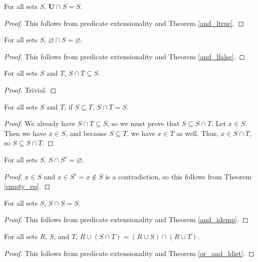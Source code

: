\documentclass[../math.tex]{subfiles}
\begin{document}
\begin{theorem} \label{inter_lid}
    For all sets $S$, $\bm U \cap S = S$.
\end{theorem}
\begin{proof}
    This follows from predicate extensionality and Theorem \ref{and_ltrue}.
\end{proof}

\begin{theorem} \label{inter_lanni}
    For all sets $S$, $\varnothing \cap S = \varnothing$.
\end{theorem}
\begin{proof}
    This follows from predicate extensionality and Theorem \ref{and_lfalse}.
\end{proof}

\begin{theorem} \label{inter_lsub}
    For all sets $S$ and $T$, $S \cap T \subseteq S$.
\end{theorem}
\begin{proof}
    Trivial.
\end{proof}

\begin{theorem} \label{lsub_inter_equal}
    For all sets $S$ and $T$, if $S \subseteq T$, $S \cap T = S$.
\end{theorem}
\begin{proof}
    We already have $S \cap T \subseteq S$, so we must prove that $S \subseteq S
    \cap T$.  Let $x \in S$.  Then we have $x \in S$, and because $S \subseteq
    T$, we have $x \in T$ as well.  Thus, $x \in S \cap T$, so $S \subseteq S
    \cap T$.
\end{proof}

\begin{theorem} \label{inter_compl_empty}
    For all sets $S$, $S \cap S^c = \varnothing$.
\end{theorem}
\begin{proof}
    $x \in S$ and $x \in S^c = x \notin S$ is a contradiction, so this follows
    from Theorem \ref{empty_eq}.
\end{proof}

\begin{theorem} \label{inter_idemp}
    For all sets $S$, $S \cap S = S$.
\end{theorem}
\begin{proof}
    This follows from predicate extensionality and Theorem \ref{and_idemp}.
\end{proof}

\begin{theorem} \label{union_ldist}
    For all sets $R$, $S$, and $T$, $R \cup (S \cap T) = (R \cup S) \cap (R \cup
    T)$.
\end{theorem}
\begin{proof}
    This follows from predicate extensionality and Theorem \ref{or_and_ldist}.
\end{proof}
\end{document}
